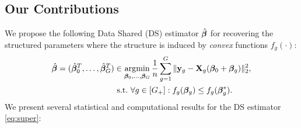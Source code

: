 \subsection{Our Contributions}
We propose the following Data Shared (DS) estimator $\hat{\boldsymbol{\beta}}$ for recovering the structured parameters where the structure is induced by \emph{convex} functions $f_g(\cdot)$:
\begin{align}
	\label{eq:super}
	\hbbe = (\hbbe_0^T, \dots, \hbbe_G^T) &\in \argmin_{\bbeta _0, \dots, \bbeta _G} \frac{1}{n} \sum_{g=1}^{G} \norm{\y_g - \X_g (\bbeta _0 + \bbeta _g)}{2}^2, 
	\\ \nr 
	&~\text{s.t.} ~ \forall g \in [G_+]:f_g(\bbeta _g) \leq f_g(\bbeta _g^*).
\end{align}
We present several statistical and computational results for the DS estimator \eqref{eq:super}:
